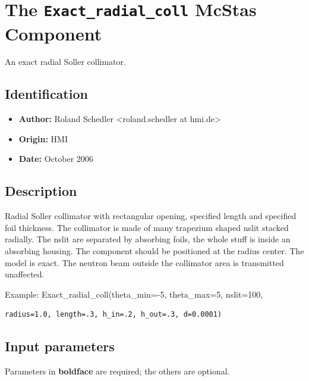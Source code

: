 \section{The \texttt{Exact\_radial\_coll} McStas Component}
An exact radial Soller collimator.

\subsection*{Identification}
\begin{itemize}
  \item \textbf{Author:} Roland Schedler \textless{}roland.schedler at hmi.de\textgreater{}
  \item \textbf{Origin:} HMI
  \item \textbf{Date:} October 2006
\end{itemize}

\subsection*{Description}
Radial Soller collimator with rectangular opening, specified length and specified foil thickness. The collimator is made of many trapezium shaped nslit stacked radially. The nslit are separated by absorbing foils, the whole stuff is inside an absorbing housing. The component should be positioned at the radius center. The model is exact. The neutron beam outside the collimator area is transmitted unaffected.

Example: Exact\_radial\_coll(theta\_min=-5, theta\_max=5, nslit=100,

\begin{verbatim}
radius=1.0, length=.3, h_in=.2, h_out=.3, d=0.0001)
\end{verbatim}

\subsection*{Input parameters}
Parameters in \textbf{boldface} are required; the others are optional.

